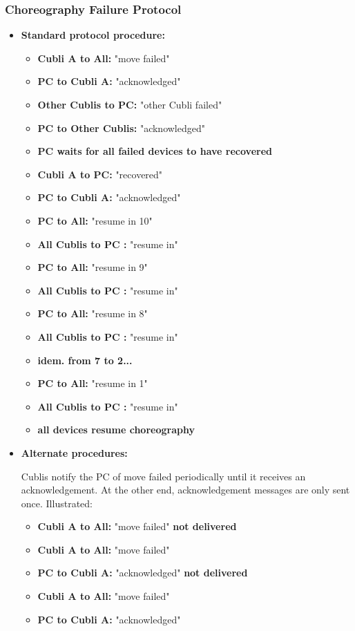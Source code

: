 \subsubsection{Choreography Failure Protocol}

\begin{itemize}
\item[] \textbf{Standard protocol procedure:}

\begin{itemize}
\item[] \textbf{Cubli A      to All:} "move failed"
\item[] \textbf{PC       to Cubli A:} "acknowledged"
\item[] \textbf{Other Cublis  to PC:} "other Cubli failed"
\item[] \textbf{PC  to Other Cublis:} "acknowledged"
\item[] \textbf{PC waits for all failed devices to have recovered}
\item[] \textbf{Cubli A       to PC:} "recovered"
\item[] \textbf{PC       to Cubli A:} "acknowledged"
\item[] \textbf{PC           to All:} "resume in 10"
\item[] \textbf{All Cublis   to PC :} "resume in"
\item[] \textbf{PC           to All:} "resume in  9"
\item[] \textbf{All Cublis   to PC :} "resume in"
\item[] \textbf{PC           to All:} "resume in  8"
\item[] \textbf{All Cublis   to PC :} "resume in"
\item[] \textbf{idem. from 7 to 2...}
\item[] \textbf{PC           to All:} "resume in  1"
\item[] \textbf{All Cublis   to PC :} "resume in"
\item[] \textbf{all devices resume choreography}
\end{itemize}

\item[] \textbf{Alternate procedures:}

Cublis notify the PC of move failed periodically until it receives an acknowledgement. At the other end, acknowledgement messages are only sent once. Illustrated:

\begin{itemize}
\item[] \textbf{Cubli A      to All:} "move failed" \textbf{not delivered}
\item[] \textbf{Cubli A      to All:} "move failed"
\item[] \textbf{PC       to Cubli A:} "acknowledged" \textbf{not delivered}
\item[] \textbf{Cubli A      to All:} "move failed"
\item[] \textbf{PC       to Cubli A:} "acknowledged"
\end {itemize}


\end{itemize}
